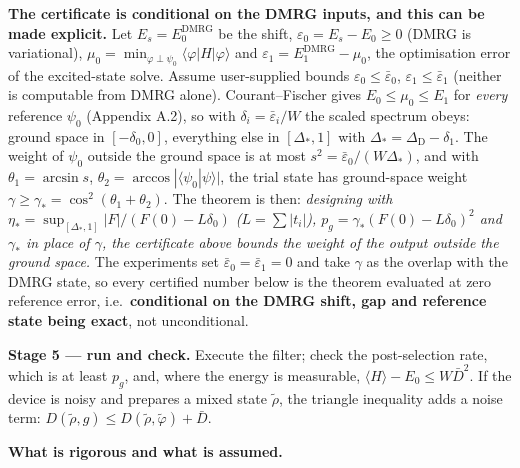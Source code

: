 \documentclass[
]{article}
\begin{document}
\textbf{The certificate is conditional on the DMRG inputs, and this can
be made explicit.} Let \(E_s=E_0^{\mathrm{DMRG}}\) be the shift,
\(\varepsilon_0=E_s-E_0\ge0\) (DMRG is variational),
\(\mu_0=\min_{\varphi\perp\psi_0}\langle\varphi|H|\varphi\rangle\) and
\(\varepsilon_1=E_1^{\mathrm{DMRG}}-\mu_0\), the optimisation error of
the excited-state solve. Assume user-supplied bounds
\(\varepsilon_0\le\bar\varepsilon_0\),
\(\varepsilon_1\le\bar\varepsilon_1\) (neither is computable from DMRG
alone). Courant--Fischer gives \(E_0\le\mu_0\le E_1\) for \emph{every}
reference \(\psi_0\) (Appendix A.2), so with
\(\delta_i=\bar\varepsilon_i/W\) the scaled spectrum obeys: ground space
in \([-\delta_0,0]\), everything else in \([\Delta_*,1]\) with
\(\Delta_*=\Delta_{\mathrm{D}}-\delta_1\). The weight of \(\psi_0\)
outside the ground space is at most
\(s^2=\bar\varepsilon_0/(W\Delta_*)\), and with \(\theta_1=\arcsin s\),
\(\theta_2=\arccos|\langle\psi_0|\psi\rangle|\), the trial state has
ground-space weight \(\gamma\ge\gamma_*=\cos^2(\theta_1+\theta_2)\). The
theorem is then: \emph{designing with
\(\eta_*=\sup_{[\Delta_*,1]}|F|/(F(0)-L\delta_0)\) (\(L=\sum|t_i|\)),
\(p_g=\gamma_*(F(0)-L\delta_0)^2\) and \(\gamma_*\) in place of
\(\gamma\), the certificate above bounds the weight of the output
outside the ground space.} The experiments set
\(\bar\varepsilon_0=\bar\varepsilon_1=0\) and take \(\gamma\) as the
overlap with the DMRG state, so every certified number below is the
theorem evaluated at zero reference error, i.e.~\textbf{conditional on
the DMRG shift, gap and reference state being exact}, not unconditional.

\textbf{Stage 5 --- run and check.} Execute the filter; check the
post-selection rate, which is at least \(p_g\), and, where the energy is
measurable, \(\langle H\rangle-E_0\le W\bar D^2\). If the device is
noisy and prepares a mixed state \(\tilde\rho\), the triangle inequality
adds a noise term:
\(D(\tilde\rho,g)\le D(\tilde\rho,\tilde\varphi)+\bar D\).

\textbf{What is rigorous and what is assumed.}
\end{document}
